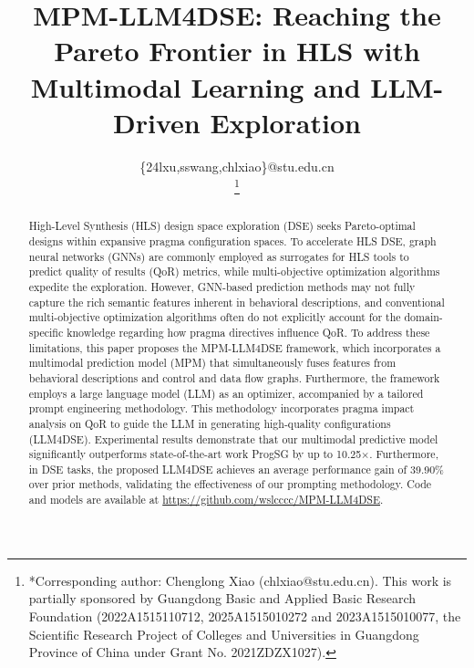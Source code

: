 \documentclass[conference]{IEEEtran}
\begin{document}
\pagestyle{fancy}
\fancyhf{}


\title{MPM-LLM4DSE: Reaching the Pareto Frontier in HLS with Multimodal Learning and LLM-Driven Exploration}

\author{
	\{24lxu,sswang,chlxiao\}@stu.edu.cn\\
	\thanks{*Corresponding author: Chenglong Xiao (chlxiao@stu.edu.cn). This work is partially sponsored by Guangdong Basic and Applied Basic Research Foundation (2022A1515110712, 2025A1515010272 and 2023A1515010077, the Scientific Research Project of Colleges and Universities in Guangdong Province of China under Grant No. 2021ZDZX1027).}}
\maketitle
\thispagestyle{fancy}

\begin{abstract}
	High-Level Synthesis (HLS) design space exploration (DSE) seeks Pareto-optimal designs within expansive pragma configuration spaces. To accelerate HLS DSE, graph neural networks (GNNs) are commonly  employed as surrogates for HLS tools to predict quality of results (QoR) metrics, while multi-objective optimization algorithms expedite the exploration. However, GNN-based prediction methods may not fully capture the rich semantic features inherent in behavioral descriptions, and conventional multi-objective optimization algorithms often do not explicitly account for the domain-specific knowledge regarding how pragma directives influence QoR.  To address these limitations, this paper proposes the MPM-LLM4DSE framework, which incorporates a multimodal prediction model (MPM) that simultaneously fuses features from behavioral descriptions and control and data flow graphs. Furthermore, the framework employs a large language model (LLM) as an optimizer, accompanied by a tailored  prompt engineering methodology. This methodology incorporates pragma impact analysis on QoR to guide the LLM in generating high-quality configurations (LLM4DSE). Experimental results demonstrate that our multimodal predictive model significantly outperforms state-of-the-art work ProgSG by up to 10.25$\times$. Furthermore, in DSE tasks, the proposed LLM4DSE achieves an average performance gain of 39.90\% over prior methods, validating the effectiveness of our prompting methodology. Code and models are available at \url{https://github.com/wslcccc/MPM-LLM4DSE}. 
\end{abstract}
\end{document}
